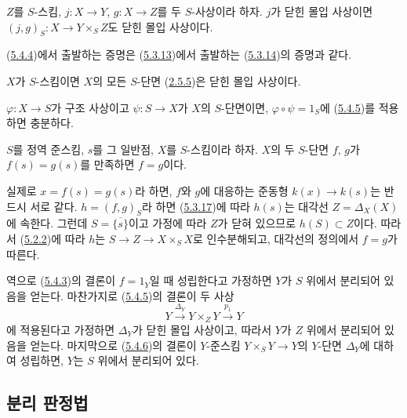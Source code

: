 \begin{corollary}[5.4.5]
\label{I.5.4.5-ko}
$Z$를 $S$-스킴, $j:X\to Y$, $g:X\to Z$를 두 $S$-사상이라 하자.
$j$가 닫힌 몰입 사상이면
$(j,g)_S:X\to Y\times_S Z$도 닫힌 몰입 사상이다.
\end{corollary}

(\hyperref[I.5.4.4-ko]{5.4.4})에서 출발하는 증명은
(\hyperref[I.5.3.13-ko]{5.3.13})에서 출발하는
(\hyperref[I.5.3.14-ko]{5.3.14})의 증명과 같다.

\begin{corollary}[5.4.6]
\label{I.5.4.6-ko}
$X$가 $S$-스킴이면 $X$의 모든 $S$-단면
(\hyperref[I.2.5.5-ko]{2.5.5})은 닫힌 몰입 사상이다.
\end{corollary}

$\varphi:X\to S$가 구조 사상이고 $\psi:S\to X$가 $X$의
$S$-단면이면, $\varphi\circ\psi=1_S$에
(\hyperref[I.5.4.5-ko]{5.4.5})를 적용하면 충분하다.

\begin{corollary}[5.4.7]
\label{I.5.4.7-ko}
$S$를 정역 준스킴, $s$를 그 일반점, $X$를 $S$-스킴이라 하자.
$X$의 두 $S$-단면 $f$, $g$가 $f(s)=g(s)$를 만족하면 $f=g$이다.
\end{corollary}

실제로 $x=f(s)=g(s)$라 하면, $f$와 $g$에 대응하는 준동형
$k(x)\to k(s)$는 반드시 서로 같다. $h=(f,g)_S$라 하면
(\hyperref[I.5.3.17-ko]{5.3.17})에 따라 $h(s)$는 대각선
$Z=\Delta_X(X)$에 속한다. 그런데 $S=\overline{\{s\}}$이고 가정에
따라 $Z$가 닫혀 있으므로 $h(S)\subset Z$이다. 따라서
(\hyperref[I.5.2.2-ko]{5.2.2})에 따라 $h$는
$S\to Z\to X\times_S X$로 인수분해되고, 대각선의 정의에서
$f=g$가 따른다.

\begin{remark}[5.4.8]
\label{I.5.4.8-ko}
역으로 (\hyperref[I.5.4.3-ko]{5.4.3})의 결론이 $f=1_Y$일 때
성립한다고 가정하면 $Y$가 $S$ 위에서 분리되어 있음을 얻는다.
마찬가지로 (\hyperref[I.5.4.5-ko]{5.4.5})의 결론이 두 사상
\[
  Y\xrightarrow{\Delta_Y}Y\times_Z Y\xrightarrow{p_1}Y
\]
에 적용된다고 가정하면 $\Delta_Y$가 닫힌 몰입 사상이고, 따라서
$Y$가 $Z$ 위에서 분리되어 있음을 얻는다. 마지막으로
(\hyperref[I.5.4.6-ko]{5.4.6})의 결론이 $Y$-준스킴
$Y\times_S Y\to Y$의 $Y$-단면 $\Delta_Y$에 대하여 성립하면,
$Y$는 $S$ 위에서 분리되어 있다.
\end{remark}

\subsection{분리 판정법}
\label{subsection:I.5.5-ko}

